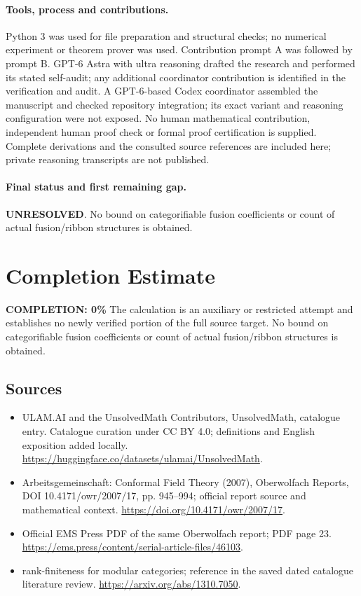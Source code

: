\documentclass[11pt]{article}
\begin{document}
\paragraph{Tools, process and contributions.}
Python 3 was used for file preparation and structural checks; no numerical experiment or theorem prover was used. Contribution prompt A was followed by prompt B. GPT-6 Astra with ultra reasoning drafted the research and performed its stated self-audit; any additional coordinator contribution is identified in the verification and audit. A GPT-6-based Codex coordinator assembled the manuscript and checked repository integration; its exact variant and reasoning configuration were not exposed. No human mathematical contribution, independent human proof check or formal proof certification is supplied. Complete derivations and the consulted source references are included here; private reasoning transcripts are not published.

\paragraph{Final status and first remaining gap.}
\textbf{UNRESOLVED}. No bound on categorifiable fusion coefficients or count of actual fusion/ribbon structures is obtained.

\section{Completion Estimate}
\noindent\textbf{COMPLETION: 0\%}
The calculation is an auxiliary or restricted attempt and establishes no newly verified portion of the full source target. No bound on categorifiable fusion coefficients or count of actual fusion/ribbon structures is obtained.

\subsection{Sources}
\begin{itemize}
\item[\hypertarget{source:statement:1}{S1}] ULAM.AI and the UnsolvedMath Contributors, UnsolvedMath, catalogue entry. Catalogue curation under CC BY 4.0; definitions and English exposition added locally.
\url{https://huggingface.co/datasets/ulamai/UnsolvedMath}.
\item[\hypertarget{source:statement:2}{S2}] Arbeitsgemeinschaft: Conformal Field Theory (2007), Oberwolfach Reports, DOI 10.4171/owr/2007/17, pp. 945--994; official report source and mathematical context.
\url{https://doi.org/10.4171/owr/2007/17}.
\item[\hypertarget{source:statement:3}{S3}] Official EMS Press PDF of the same Oberwolfach report; PDF page 23.
\url{https://ems.press/content/serial-article-files/46103}.
\item[\hypertarget{source:statement:4}{S4}] rank-finiteness for modular categories; reference in the saved dated catalogue literature review.
\url{https://arxiv.org/abs/1310.7050}.
\end{itemize}
\label{end:statement}
\end{document}
